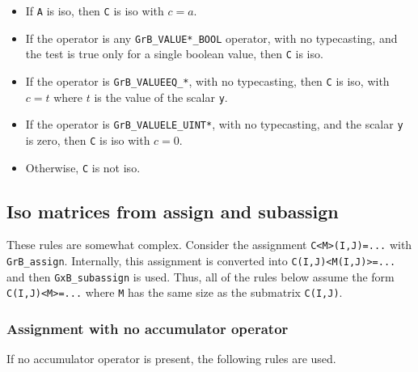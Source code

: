    \begin{itemize}
    \item If \verb'A' is iso, then \verb'C' is iso with $c=a$.
    \item If the operator is any \verb'GrB_VALUE*_BOOL' operator,
        with no typecasting, and the test is true only for a single boolean
        value, then \verb'C' is iso.
    \item If the operator is \verb'GrB_VALUEEQ_*', with no typecasting,
        then \verb'C' is iso, with $c=t$ where $t$ is the value of the scalar
        \verb'y'.
    \item If the operator is \verb'GrB_VALUELE_UINT*', with no typecasting,
        and the scalar \verb'y' is zero, then \verb'C' is iso with $c=0$.
    \item Otherwise, \verb'C' is not iso.
    \end{itemize}

\subsection{Iso matrices from assign and subassign}
\label{iso_assign}

These rules are somewhat complex.  Consider the assignment \verb'C<M>(I,J)=...'
with \verb'GrB_assign'.  Internally, this assignment is converted into
\verb'C(I,J)<M(I,J)>=...' and then \verb'GxB_subassign' is used.  Thus,
all of the rules below assume the form \verb'C(I,J)<M>=...' where \verb'M'
has the same size as the submatrix \verb'C(I,J)'.

\subsubsection{Assignment with no accumulator operator}

If no accumulator operator is present, the following rules are used.

